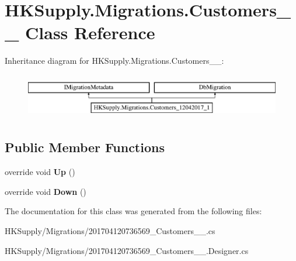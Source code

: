 \hypertarget{class_h_k_supply_1_1_migrations_1_1_customers__12042017__1}{}\section{H\+K\+Supply.\+Migrations.\+Customers\+\_\+\_ Class Reference}
\label{class_h_k_supply_1_1_migrations_1_1_customers__12042017__1}
Inheritance diagram for H\+K\+Supply.\+Migrations.\+Customers\+\_\+\_\+:\begin{figure}[H]
\begin{center}
\leavevmode
\includegraphics[height=2.000000cm]{class_h_k_supply_1_1_migrations_1_1_customers__12042017__1}
\end{center}
\end{figure}
\subsection*{Public Member Functions}
\begin{DoxyCompactItemize}
\item 
\mbox{\label{class_h_k_supply_1_1_migrations_1_1_customers__12042017__1_a471861e4d06e20d64c6134289604a5da}} 
override void {\bfseries Up} ()
\item 
\mbox{\label{class_h_k_supply_1_1_migrations_1_1_customers__12042017__1_a7e61bfa8077335504dd3ecd6b78e4869}} 
override void {\bfseries Down} ()
\end{DoxyCompactItemize}


The documentation for this class was generated from the following files\+:\begin{DoxyCompactItemize}
\item 
H\+K\+Supply/\+Migrations/201704120736569\+\_\+\+Customers\+\_\+\_.\+cs\item 
H\+K\+Supply/\+Migrations/201704120736569\+\_\+\+Customers\+\_\+\_.\+Designer.\+cs\end{DoxyCompactItemize}
